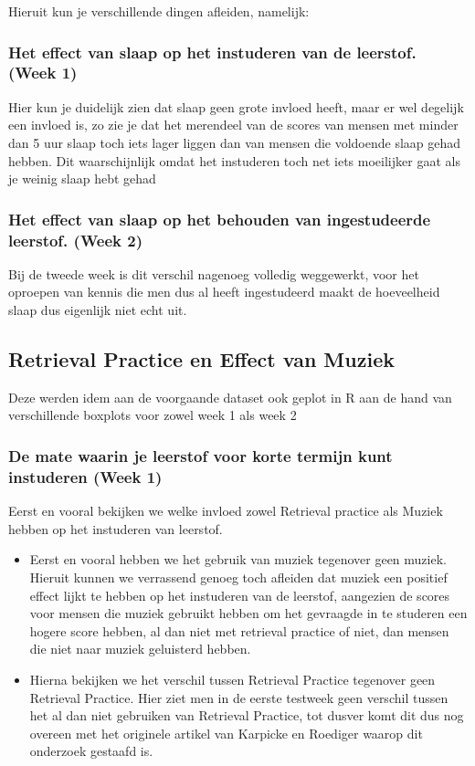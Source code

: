 \documentclass{hogent-article}
\begin{document}
Hieruit kun je verschillende dingen afleiden, namelijk:

\subsubsection{Het effect van slaap op het instuderen van de leerstof. (Week 1)}

Hier kun je duidelijk zien dat slaap geen grote invloed heeft, maar er wel degelijk een invloed is, zo zie je dat het merendeel van de scores van mensen met minder dan 5 uur slaap toch iets lager liggen dan van mensen die voldoende slaap gehad hebben. Dit waarschijnlijk omdat het instuderen toch net iets moeilijker gaat als je weinig slaap hebt gehad

\subsubsection{Het effect van slaap op het behouden van ingestudeerde leerstof. (Week 2)}

Bij de tweede week is dit verschil nagenoeg volledig weggewerkt, voor het oproepen van kennis die men dus al heeft ingestudeerd maakt de hoeveelheid slaap dus eigenlijk niet echt uit.

\subsection{Retrieval Practice en Effect van Muziek}

Deze werden idem aan de voorgaande dataset ook geplot in R aan de hand van verschillende boxplots voor zowel week 1 als week 2

\subsubsection{De mate waarin je leerstof voor korte termijn kunt instuderen (Week 1)}

Eerst en vooral bekijken we welke invloed zowel Retrieval practice als Muziek hebben op het instuderen van leerstof.

\begin{itemize}
    \item Eerst en vooral hebben we het gebruik van muziek tegenover geen muziek.
    Hieruit kunnen we verrassend genoeg toch afleiden dat muziek een positief effect lijkt te hebben op het instuderen van de leerstof, aangezien de scores voor mensen die muziek gebruikt hebben om het gevraagde in te studeren een hogere score hebben, al dan niet met retrieval practice of niet, dan mensen die niet naar muziek geluisterd hebben.
    \item Hierna bekijken we het verschil tussen Retrieval Practice tegenover geen Retrieval Practice.
    Hier ziet men in de eerste testweek geen verschil tussen het al dan niet gebruiken van Retrieval Practice, tot dusver komt dit dus nog overeen met het originele artikel van Karpicke en Roediger waarop dit onderzoek gestaafd is.
    
\end{itemize}
\end{document}
